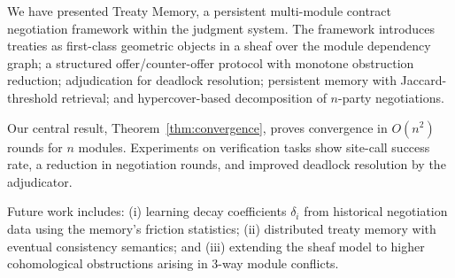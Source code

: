 \documentclass[11pt]{article}
\begin{document}
We have presented Treaty Memory, a persistent multi-module contract
negotiation framework within the \JuGeo{} judgment system.  The
framework introduces treaties as first-class geometric objects in
a sheaf over the module dependency graph; a structured
offer/counter-offer protocol with monotone obstruction reduction;
adjudication for deadlock resolution; persistent memory with
Jaccard-threshold retrieval; and hypercover-based decomposition
of $n$-party negotiations.

Our central result, Theorem~\ref{thm:convergence}, proves
convergence in $O(n^2)$ rounds for $n$ modules.  Experiments on
verification tasks show \subSiteSuccessRate{} site-call success rate,
a reduction in negotiation rounds, and improved deadlock
resolution by the adjudicator.

Future work includes:
(i) learning decay coefficients $\delta_i$ from historical
negotiation data using the memory's friction statistics;
(ii) distributed treaty memory with eventual consistency semantics;
and
(iii) extending the sheaf model to higher cohomological obstructions
arising in 3-way module conflicts.
\end{document}
